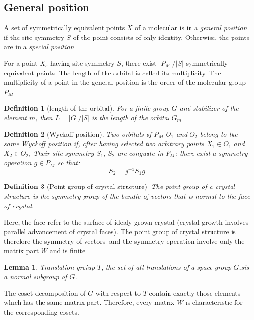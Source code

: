\documentclass{amsart}
\newtheorem{definition}{Definition}
\newtheorem{lemma}{Lemma}
\begin{document}
\subsection*{General position}
A set of symmetrically equivalent points $X$ of a molecular is in a \emph{general position} if the site symmetry $S$ of the point
consists of only identity. 
Otherwise, the points are in a \emph{special position}

For a point $X_s$ having site symmetry $S$, there exist $|P_M|/|S|$ symmetrically equivalent points. 
The length of the orbital is called its multiplicity.
The multiplicity of a point in the general position is the order of the molecular group $P_M$.

\begin{definition}
    [length of the orbital]
    For a finite group $G$ and stabilizer of the element $m$, then $L = |G|/|S|$ is the length of the orbital $G_m$
\end{definition}

\begin{definition}
    [Wyckoff position]
    Two orbitals of $P_M$ $O_1$ and $O_2$ belong to the same Wyckoff position if, after having selected two arbitrary points $X_1 \in O_1$ 
    and $X_2 \in O_2$, Their site symmetry $S_1$, $S_2$ are conguate in $P_M$: there exist a symmetry operation $g \in P_M$ so that:
    \[S_2 = g^{-1}S_1 g\]
\end{definition}

\vspace{10pt}

\begin{definition}
    [Point group of crystal structure]
    The point group of a crystal structure is the symmetry group of the bundle of vectors that is normal to the face of crystal.
\end{definition}
Here, the face refer to the surface of idealy grown crystal (crystal growth involves parallel advancement of crystal faces). 
The point group of crystal structure is therefore the symmetry of vectors, and the symmetry operation involve only 
the matrix part $W$ and is finite

\begin{lemma}
    Translation groiup $T$, the set of all translations of a space group $G$,sis a normal subgroup of $G$.
\end{lemma}
The coset decomposition of $G$ with respect to $T$ contain exactly those elements which has the same matrix part. 
Therefore, every matrix $W$ is characteristic for the corresponding cosets. 
\end{document}
